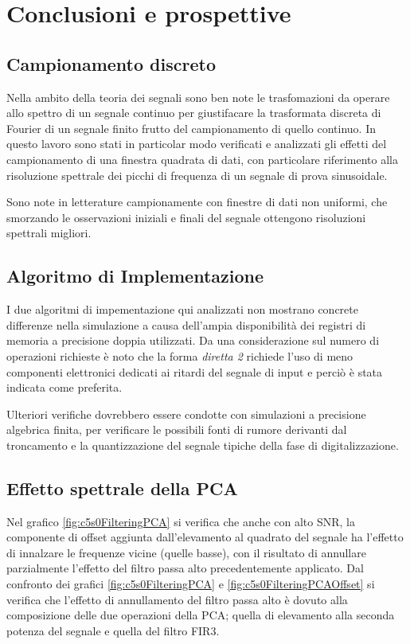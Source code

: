 

\chapter{Conclusioni e prospettive}
\label{capitolo:conclusioni}


\section{Campionamento discreto}

Nella ambito della teoria dei segnali sono ben note le trasfomazioni da operare allo spettro di un segnale continuo per giustifacare la trasformata discreta di Fourier di un segnale finito frutto del campionamento di quello continuo. In questo lavoro sono stati in particolar modo verificati e analizzati gli effetti del campionamento di una finestra quadrata di dati, con particolare riferimento alla risoluzione spettrale dei picchi di frequenza di un segnale di prova sinusoidale.

Sono note in letterature campionamente con finestre di dati non uniformi, che smorzando le osservazioni iniziali e finali del segnale ottengono risoluzioni spettrali migliori.


\section{Algoritmo di Implementazione}

I due algoritmi di impementazione qui analizzati non mostrano concrete differenze nella simulazione a causa dell'ampia disponibilità dei registri di memoria a precisione doppia utilizzati. Da una considerazione sul numero di operazioni richieste è noto che la forma {\it diretta 2} richiede l'uso di meno componenti elettronici dedicati ai ritardi del segnale di input e perciò è stata indicata come preferita.

Ulteriori verifiche dovrebbero essere condotte con simulazioni a precisione algebrica finita, per verificare le possibili fonti di rumore derivanti dal troncamento e la quantizzazione del segnale tipiche della fase di digitalizzazione.


\section{Effetto spettrale della PCA}

Nel grafico \ref{fig:c5s0FilteringPCA} si verifica che anche con alto SNR, la componente di offset aggiunta dall'elevamento al quadrato del segnale ha l'effetto di innalzare le frequenze vicine (quelle basse), con il risultato di annullare parzialmente l'effetto del filtro passa alto precedentemente applicato.
Dal confronto dei grafici \ref{fig:c5s0FilteringPCA} e \ref{fig:c5s0FilteringPCAOffset} si verifica che l'effetto di annullamento del filtro passa alto è dovuto alla composizione delle due operazioni della PCA; quella di elevamento alla seconda potenza del segnale e quella del filtro FIR3.
